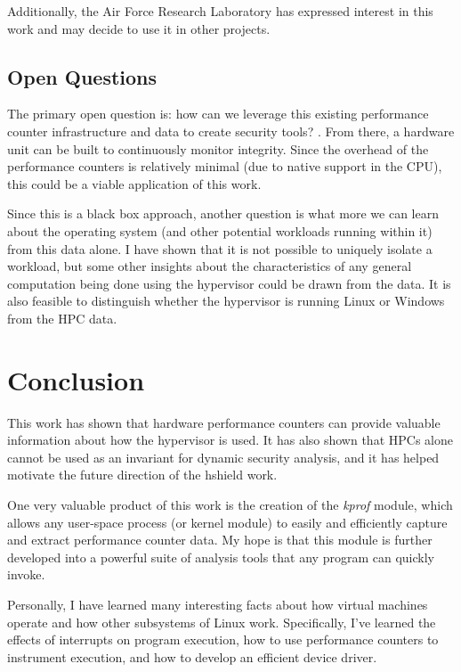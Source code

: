\documentclass[notitlepage]{article}
\begin{document}
Additionally, the Air Force Research Laboratory has expressed interest in this
work and may decide to use it in other projects.

\subsection{Open Questions}
The primary open question is: how can we leverage this existing performance
counter infrastructure and data to create security tools? . From there, a
hardware unit can be built to continuously monitor integrity. Since the overhead
of the performance counters is relatively minimal (due to native support in the
CPU), this could be a viable application of this work.

Since this is a black box approach, another question is what more we can learn
about the operating system (and other potential workloads running within it)
from this data alone. I have shown that it is not possible to uniquely isolate a
workload, but some other insights about the characteristics of any general
computation being done using the hypervisor could be drawn from the data. It is
also feasible to distinguish whether the hypervisor is running Linux or Windows
from the HPC data.

\section{Conclusion}
\label{sec:conclusion}
This work has shown that hardware performance counters can provide valuable
information about how the hypervisor is used. It has also shown that HPCs alone
cannot be used as an invariant for dynamic security analysis, and it has helped
motivate the future direction of the hshield work.

One very valuable product of this work is the creation of the \textit{kprof}
module, which allows any user-space process (or kernel module) to easily and
efficiently capture and extract performance counter data. My hope is that this
module is further developed into a powerful suite of analysis tools that any
program can quickly invoke.

Personally, I have learned many interesting facts about how virtual machines
operate and how other subsystems of Linux work. Specifically, I've learned the
effects of interrupts on program execution, how to use performance counters to
instrument execution, and how to develop an efficient device driver.

\nocite{*}

{}

\end{document}
